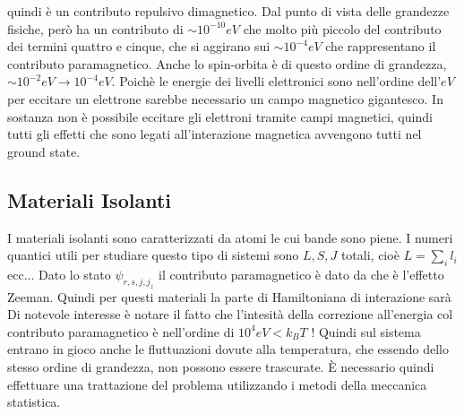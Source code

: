 \documentclass[a4paper,12pt]{article}
\begin{document}
quindi è un contributo repulsivo dimagnetico. Dal punto di vista delle grandezze fisiche, però ha un contributo di $\sim 10^{-10}eV$ che molto più piccolo del contributo dei termini quattro e cinque, che si aggirano sui $\sim 10^{-4}eV$ che rappresentano il contributo paramagnetico. Anche lo spin-orbita è di questo ordine di grandezza, $\sim 10^{-2}eV \to 10^{-4}eV$.
Poichè le energie dei livelli elettronici sono nell'ordine dell'$eV$ per eccitare un elettrone sarebbe necessario un campo magnetico gigantesco. In sostanza non è possibile eccitare gli elettroni tramite campi magnetici, quindi tutti gli effetti che sono legati all'interazione magnetica avvengono tutti nel ground state.
\subsection{Materiali Isolanti}
I materiali isolanti sono caratterizzati da atomi le cui bande sono piene. I numeri quantici utili per studiare questo tipo di sistemi sono $L,S,J$ totali, cioè $L=\sum_i l_i$ ecc... Dato lo stato $\psi_{r,s,j,j_z}$ il contributo paramagnetico è dato da
che è l'effetto Zeeman. Quindi per questi materiali la parte di Hamiltoniana di interazione sarà
Di notevole interesse è notare il fatto che l'intesità della correzione all'energia col contributo paramagnetico è nell'ordine di $10^4eV <k_BT$ ! Quindi sul sistema entrano in gioco anche le fluttuazioni dovute alla temperatura, che essendo dello stesso ordine di grandezza, non possono essere trascurate. \`E necessario quindi effettuare una trattazione del problema utilizzando i metodi della meccanica statistica.
\end{document}
